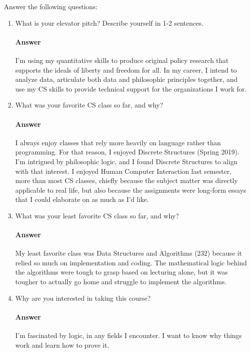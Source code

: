 \documentclass{article}
\begin{document}
Answer the following questions:
\begin{enumerate}
    \item What is your elevator pitch?  Describe yourself in 1-2
                sentences.

        \paragraph{Answer}{I'm using my quantitative skills to produce original policy research that supports the ideals of liberty and freedom for all. In my career, I intend to analyze data, articulate both data and philosophic principles together, and use my CS skills to provide technical support for the organizations I work for.}

     \item What was your favorite CS class so far, and why?

         \paragraph{Answer}{I always enjoy classes that rely more heavily on language rather than programming. For that reason, I enjoyed Discrete Structures (Spring 2019). I'm intrigued by philosophic logic, and I found Discrete Structures to align with that interest. I enjoyed Human Computer Interaction last semester, more than most CS classes, chiefly because the subject matter was directly applicable to real life, but also because the assignments were long-form essays that I could elaborate on as much as I'd like.}

     \item What was your least favorite CS class so far, and why?

         \paragraph{Answer}{My least favorite class was Data Structures and Algorithms (232) because it relied so much on implementation and coding. The mathematical logic behind the algorithms were tough to grasp based on lecturing alone, but it was tougher to actually go home and struggle to implement the algorithms.} 

     \item Why are you interested in taking this course?

         \paragraph{Answer}{I'm fascinated by logic, in any fields I encounter. I want to know why things work and learn how to prove it.} 


\end{enumerate}
\end{document}
